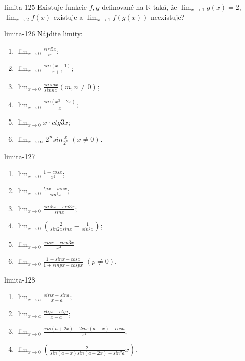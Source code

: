 \begin{defproblem}{limita-125}
Existuje funkcie $f,g$ definované na $\mathbb{R}$ taká, že $\lim_{x \rightarrow 1} g(x)=2$, $\lim_{x \rightarrow 2} f(x)$ existuje a $\lim_{x \rightarrow 1} f(g(x))$ neexistuje?
\end{defproblem}

\begin{defproblem}{limita-126}
Nájdite limity:
\begin{multicols}{2}
\begin{enumerate}
    \item $\lim_{x \rightarrow 0} \frac{sin 5x}{x}$;
    \item $\lim_{x \rightarrow 0} \frac{sin (x+1)}{x+1}$;
    \item $\lim_{x \rightarrow 0}  \frac{sin mx}{sin nx} (m,n \neq 0)$;
    \item $\lim_{x \rightarrow 0} \frac{sin (x^3+2x)}{x}$;
    \item $\lim_{x \rightarrow 0} x \cdot ctg 3x$;
    \item $\lim_{x \rightarrow \infty} 2^n sin \frac{x}{2^n}$  $(x \neq 0)$.
\end{enumerate}
\end{multicols}
\end{defproblem}

\begin{defproblem}{limita-127}
\begin{multicols}{2}
\begin{enumerate}
    \item $\lim_{{x \rightarrow 0}} \frac{1-cos x}{x^2}$;
    \item $\lim_{{x \rightarrow 0}} \frac{tg x-sin x}{sin ^3 x}$;
    \item $\lim_{{x \rightarrow 0}}  \frac{sin 5x-sin 3x}{sin x}$;
    \item $\lim_{{x \rightarrow 0}} (\frac{2}{sin 2x sin x}-\frac{1}{sin ^2 x})$;
    \item $\lim_{{x \rightarrow 0}} \frac{cos x - com 3x}{x^2} $
    \item $\lim_{x \rightarrow 0} \frac{1+sin x - cos x}{1+ sin px - cos px}$  $(p \neq 0)$.
\end{enumerate}
\end{multicols}
\end{defproblem}

\begin{defproblem}{limita-128}
\begin{multicols}{2}
\begin{enumerate}
    \item $\lim_{{x \rightarrow a}} \frac{sin x - sin a}{x-a}$;
    \item $\lim_{{x \rightarrow a}} \frac{ctg x - ctg a}{x-a}$;
    \item $\lim_{{x \rightarrow 0}}  \frac{cos (a+2x)-2 cos (a+x)+cos a}{x^2}$;
    \item $\lim_{{x \rightarrow 0}} (\frac{2}{sin (a+x) sin (a+2x)-sin ^2 a}{x})$.
\end{enumerate}
\end{multicols}
\end{defproblem}

